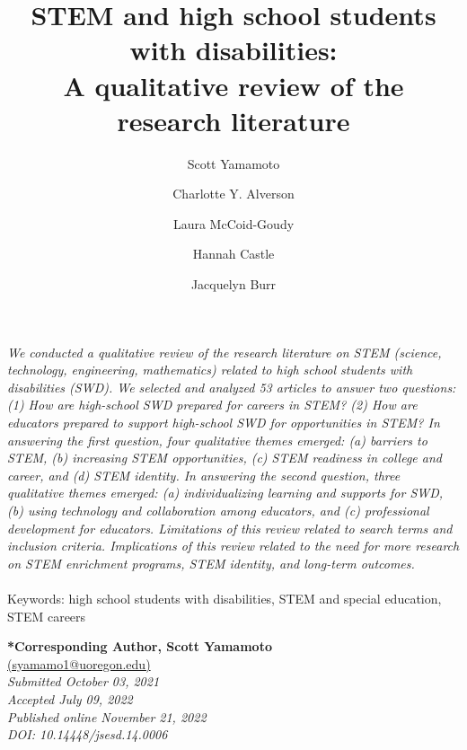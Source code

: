 \documentclass[11pt]{sig-alternate}
\makeatletter
\let\oldabstract\abstract
\let\oldendabstract\endabstract
\renewenvironment{abstract}
{\renewenvironment{quotation}%
               {\list{}{\addtolength{\leftmargin}{1em} %
                        \listparindent 1.5em%
                        \itemindent    \listparindent%
                        \rightmargin   \leftmargin%
                        \parsep        \z@ \@plus\p@}%
                \item\relax}%
               {\endlist}%
\oldabstract}
{\oldendabstract}
\makeatother
\begin{document}
\title{STEM and high school students with disabilities:\\
A qualitative review of the research literature}

\author[1]{\large \color{blue} Scott Yamamoto}
\author[1]{\large \color{blue} Charlotte Y. Alverson}
\author[1]{\large \color{blue}   Laura McCoid-Goudy}
\author[1]{\large \color{blue}   Hannah Castle}
\author[1]{\large \color{blue}   Jacquelyn Burr}


\toappear{}

\maketitle
\begin{@twocolumnfalse} 

\begin{abstract}
    \begin{large}

     \textit{We conducted a qualitative review of the research literature on STEM (science, technology, engineering, mathematics) related to high school students with disabilities (SWD). We selected and analyzed 53 articles to answer two questions: (1) How are high-school SWD prepared for careers in STEM? (2) How are educators prepared to support high-school SWD for opportunities in STEM? In answering the first question, four qualitative themes emerged: (a) barriers to STEM, (b) increasing STEM opportunities, (c) STEM readiness in college and career, and (d) STEM identity. In answering the second question, three qualitative themes emerged: (a) individualizing learning and supports for SWD, (b) using technology and collaboration among educators, and (c) professional development for educators. Limitations of this review related to search terms and inclusion criteria. Implications of this review related to the need for more research on STEM enrichment programs, STEM identity, and long-term outcomes.}
     \\
     \\
     Keywords: high school students with disabilities, STEM and special education, STEM careers
    \end{large}
\end{abstract}
\end{@twocolumnfalse}



\textbf{*Corresponding Author, Scott Yamamoto}\\
\href{mailto:syamamo1@uoregon.edu}{(syamamo1@uoregon.edu)}\\
\textit{Submitted October 03, 2021 }\\
\textit{Accepted July 09, 2022} \\
\textit{Published online November 21, 2022} \\
\textit{DOI: 10.14448/jsesd.14.0006} \\
\end{document}
